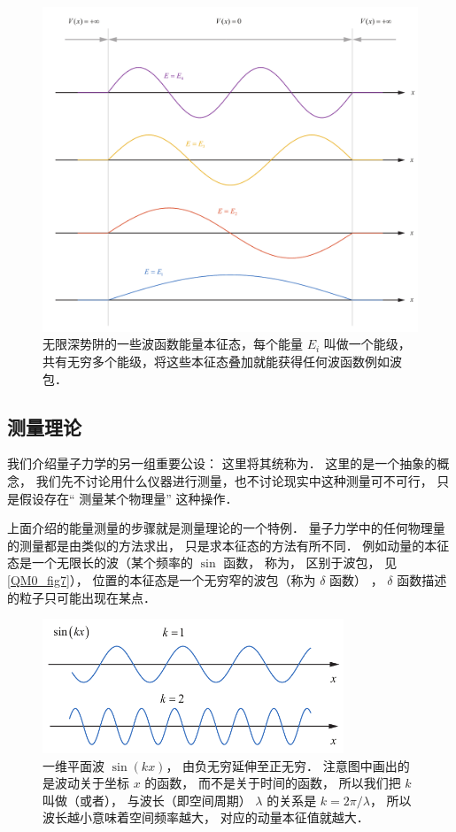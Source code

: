 \begin{figure}[ht]
\centering
\includegraphics[width=14cm]{./figures/QM04.pdf}
\caption{无限深势阱的一些波函数能量本征态，每个能量 $E_i$ 叫做一个能级，共有无穷多个能级，将这些本征态叠加就能获得任何波函数例如波包．} \label{QM0_fig4}
\end{figure}

\subsection{测量理论}
我们介绍量子力学的另一组重要公设： 这里将其统称为． 这里的是一个抽象的概念， 我们先不讨论用什么仪器进行测量，也不讨论现实中这种测量可不可行， 只是假设存在“ 测量某个物理量” 这种操作．

上面介绍的能量测量的步骤就是测量理论的一个特例． 量子力学中的任何物理量的测量都是由类似的方法求出， 只是求本征态的方法有所不同． 例如动量的本征态是一个无限长的波（某个频率的 $\sin$ 函数， 称为， 区别于波包， 见\autoref{QM0_fig7}）， 位置的本征态是一个无穷窄的波包（称为 $\delta$ 函数）%
， $\delta$ 函数描述的粒子只可能出现在某点． 

\begin{figure}[ht]
\centering
\includegraphics[width=9cm]{./figures/QM07.pdf}
\caption{一维平面波 $\sin(kx)$， 由负无穷延伸至正无穷． 注意图中画出的是波动关于坐标 $x$ 的函数， 而不是关于时间的函数， 所以我们把 $k$ 叫做（或者）， 与波长（即空间周期） $\lambda$ 的关系是 $k = 2\pi/\lambda$， 所以波长越小意味着空间频率越大， 对应的动量本征值就越大．} \label{QM0_fig7}
\end{figure}

